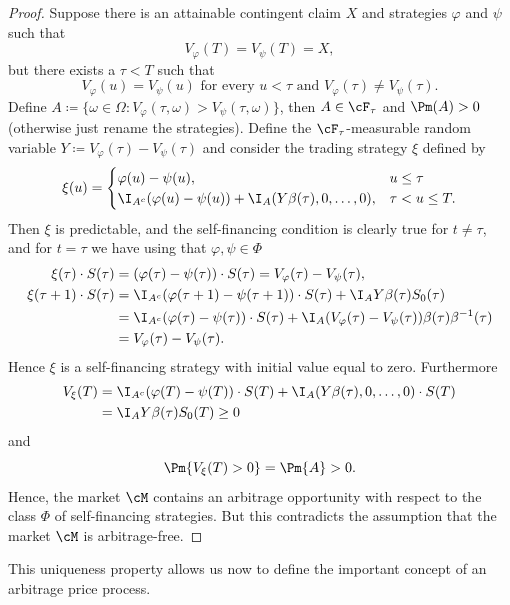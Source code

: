 \begin{proof}
	Suppose there is an attainable contingent claim $X$ and strategies $\varphi$ and $\psi$ such that
	\[
		V_{\varphi}(T) = V_{\psi}(T) = X,
	\]
	but there exists a $\tau < T$ such that
	\[
		V_{\varphi}(u) = V_{\psi}(u) \text{ for every } u < \tau \text{ and } V_{\varphi}(\tau) \neq V_{\psi}(\tau).
	\]
	Define $A \coloneqq \{ \omega \in \Omega : V_{\varphi}(\tau, \omega) > V_{\psi}(\tau, \omega) \}$, then $A \in \cF_{\tau}$ and $\Pm(A) > 0$ (otherwise just rename the strategies). Define the $\cF_{\tau}$-measurable random variable $Y \coloneqq V_{\varphi}(\tau) - V_{\psi}(\tau)$ and consider the trading strategy $\xi$ defined by
	\[
		\xi(u) = \begin{cases}
			\varphi(u) - \psi(u),                                             & u \leq \tau      \\
			\I_{A^c}(\varphi(u) - \psi(u)) + \I_A(Y\beta(\tau), 0, \dots, 0), & \tau < u \leq T.
		\end{cases}
	\]
	Then \(\xi\) is predictable, and the self-financing condition  is clearly true for \(t \neq \tau\), and for \(t = \tau\) we have using that \(\varphi, \psi \in \Phi\)
	\begin{align*}
		\xi(\tau) \cdot S(\tau)     & = (\varphi(\tau) - \psi(\tau)) \cdot S(\tau) = V_{\varphi}(\tau) - V_{\psi}(\tau),                                            \\
		\xi(\tau + 1) \cdot S(\tau) & = \I_{A^c}(\varphi(\tau + 1) - \psi(\tau + 1)) \cdot S(\tau) + \I_A Y \beta(\tau) S_0(\tau)                                   \\
		                            & = \I_{A^c}(\varphi(\tau) - \psi(\tau)) \cdot S(\tau) + \I_A (V_{\varphi}(\tau) - V_{\psi}(\tau)) \beta(\tau) \beta^{-1}(\tau) \\
		                            & = V_{\varphi}(\tau) - V_{\psi}(\tau).
	\end{align*}
	Hence $\xi$ is a self-financing strategy with initial value equal to zero. Furthermore
	\[
		\begin{aligned}
			V_{\xi}(T) & = \I_{A^c}(\varphi(T) - \psi(T)) \cdot S(T) + \I_A (Y \beta(\tau), 0, \dots, 0) \cdot S(T) \\
			           & = \I_A Y \beta(\tau) S_0(T) \geq 0
		\end{aligned}
	\]
	and
	\[
		\Pm\{V_{\xi}(T) > 0\} = \Pm\{A\} > 0.
	\]
	Hence, the market $\cM$ contains an arbitrage opportunity with respect to the class $\Phi$ of self-financing strategies. But this contradicts the assumption that the market $\cM$ is arbitrage-free.
\end{proof}
This uniqueness property allows us now to define the important concept of an arbitrage price process.

